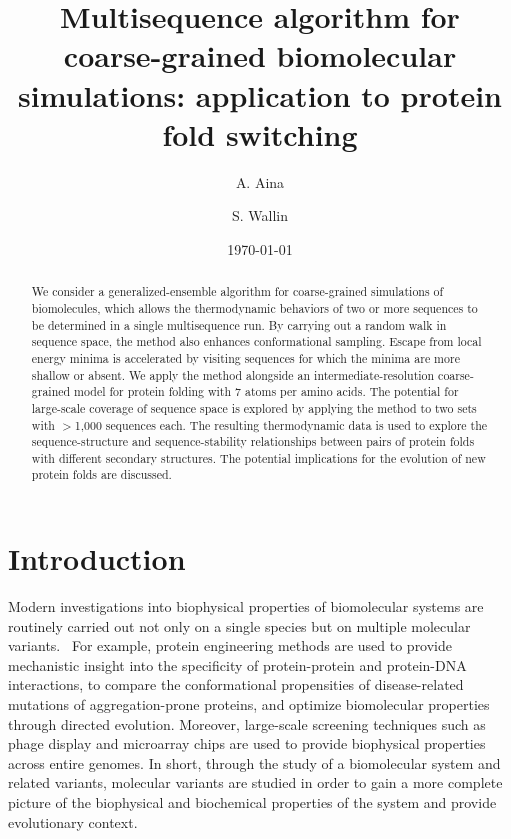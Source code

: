 \documentclass[%
 aip,
rsi,%
 amsmath,amssymb,
 reprint,%
]{revtex4-1}
\begin{document}

\title[Multisequence Monte Carlo simulations]{Multisequence algorithm for coarse-grained biomolecular simulations: application to protein fold switching}

\author{A. Aina}
\author{S. Wallin}

\date{\today}

\begin{abstract}

We consider a generalized-ensemble algorithm for coarse-grained simulations of biomolecules, which allows the thermodynamic behaviors of two or more sequences to be determined in a single multisequence run. By carrying out a random walk in sequence space, the method also enhances conformational sampling. Escape from local energy minima is accelerated by visiting sequences for which the minima are more shallow or absent. We apply the method alongside an intermediate-resolution coarse-grained model for protein folding with 7 atoms per amino acids. The potential for large-scale coverage of sequence space is explored by applying the method to two sets with $>$1,000 sequences each. The resulting thermodynamic data is used to explore the sequence-structure and sequence-stability relationships between pairs of protein folds with different secondary structures. The potential implications for the evolution of new protein folds are discussed. 

 
\end{abstract}

                             


\maketitle

\section{Introduction}
\noindent
Modern investigations into biophysical properties of biomolecular systems are routinely carried out not only on a single species but on multiple molecular variants.~\cite{Vukmirovic2000,Nickson2010} For example, protein engineering methods are used to provide mechanistic insight into the specificity of protein-protein and protein-DNA interactions, to compare the  conformational propensities of disease-related mutations of aggregation-prone proteins, and optimize biomolecular properties through directed evolution. Moreover, large-scale screening techniques such as phage display and microarray chips are used to provide biophysical properties across entire genomes. In short, through the study of a biomolecular system and related variants, molecular variants are studied in order to gain a more complete picture of the biophysical and biochemical properties of the system and provide evolutionary context. 
\end{document}
